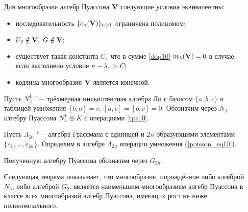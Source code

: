 \smallskip



\begin{theorem}

Для многообразия алгебр Пуассона ${\bf V}$ следующие условия эквивалентны\/$:$



\begin{itemize}

\item[\rm (i)] последовательность $\{c_n({\bf V})\}_{n \geq 1}$ ограничена полиномом$;$



\item[\rm (ii)] $U_2 \notin {\bf V},$ $G \notin {\bf V};$



\item[\rm (iii)]  существует такая константа $C,$ что в сумме \eqref{dop10}  $m_\lambda({\bf V}) = 0$ в случае$,$ если выполнено условие $n - \lambda_1 > C;$



\item[\rm (iv)] кодлина многообразия ${\bf V}$ является конечной$.$



\end{itemize}





\end{theorem}



\smallskip



Пусть $N^L_3$ "--- трёхмерная нильпотентная алгебра Ли с базисом $\{a,b,c\}$ и таблицей умножения  $[b,a] = c$, $[a,c] = [b,c] = 0$. Обозначим через $N_3$  алгебру Пуассона $N^L_3 \oplus K$ с операциями \eqref{rps10}.



Пусть $\Lambda_{2n}$ "--- алгебра Грассмана с единицей и $2n$ образующими элементами $\{e_1, \dots ,e_{2n}\}$. Определим в алгебре $\Lambda_{2n}$ операции умножения (\ref{poisson_eq10}).

Полученную алгебру Пуассона обозначим через $G_{2n}$.



Следующая теорема показывает, что многообразие, порождённое либо алгеброй $N_3$, либо алгеброй $G_2$, является наименьшим многообразием алгебр Пуассона в классе всех многообразий алгебр Пуассона, имеющих рост не ниже полиномиального.





